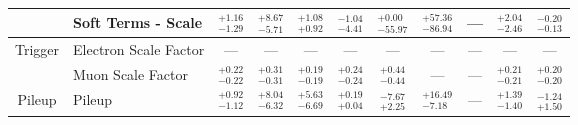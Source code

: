 \begin{tabular}{|cl||ccccccc|c||c|}
\cline{2-11}
&Soft Terms - Scale &  $^{+1.16}_{-1.29}$  &  $^{+8.67}_{-5.71}$  &  $^{+1.08}_{+0.92}$  &  $^{-1.04}_{-4.41}$  &  $^{+0.00}_{-55.97}$  &  $^{+57.36}_{-86.94}$  & --- &  $^{+2.04}_{-2.46}$  &  $^{-0.20}_{-0.13}$ \\ 
\hline
\multirow{2}{*}{Trigger}
&Electron Scale Factor & --- & --- & --- & --- & --- & --- & --- & --- & ---\\ 
\cline{2-11}
&Muon Scale Factor &  $^{+0.22}_{-0.22}$  &  $^{+0.31}_{-0.31}$  &  $^{+0.19}_{-0.19}$  &  $^{+0.24}_{-0.24}$  &  $^{+0.44}_{-0.44}$  & --- & --- &  $^{+0.21}_{-0.21}$  &  $^{+0.20}_{-0.20}$ \\ 
\hline
\multirow{1}{*}{Pileup}
&Pileup &  $^{+0.92}_{-1.12}$  &  $^{+8.04}_{-6.32}$  &  $^{+5.63}_{-6.69}$  &  $^{+0.19}_{+0.04}$  &  $^{-7.67}_{+2.25}$  &  $^{+16.49}_{-7.18}$  & --- &  $^{+1.39}_{-1.40}$  &  $^{-1.24}_{+1.50}$ \\ 
\hline
\end{tabular}
